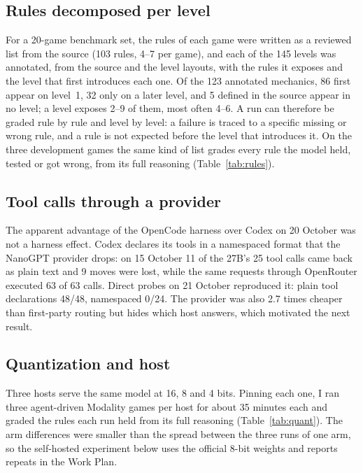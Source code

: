 \documentclass[11pt,a4paper]{article}
\begin{document}
\subsection{Rules decomposed per level}
\label{sec:rules}

For a 20-game benchmark set, the rules of each game were written as a
reviewed list from the source (103 rules, 4--7 per game), and each of the 145
levels was annotated, from the source and the level layouts, with the rules
it exposes and the level that first introduces each one. Of the 123
annotated mechanics, 86 first appear on level~1, 32 only on a later level,
and 5 defined in the source appear in no level; a level exposes 2--9 of them,
most often 4--6. A run can therefore be graded rule by rule and level by
level: a failure is traced to a specific missing or wrong rule, and a rule
is not expected before the level that introduces it. On the three
development games the same kind of list grades every rule the model held,
tested or got wrong, from its full reasoning (Table~\ref{tab:rules}).

\subsection{Tool calls through a provider}
\label{sec:q1}

The apparent advantage of the OpenCode harness over Codex on 20 October was
not a harness effect. Codex declares its tools in a namespaced format that
the NanoGPT provider drops: on 15 October 11 of the 27B's 25 tool calls came
back as plain text and 9 moves were lost, while the same requests through
OpenRouter executed 63 of 63 calls. Direct probes on 21 October reproduced it:
plain tool declarations 48/48, namespaced 0/24. The provider was also 2.7
times cheaper than first-party routing but hides which host answers, which
motivated the next result.

\subsection{Quantization and host}

Three hosts serve the same model at 16, 8 and 4 bits. Pinning each one, I ran
three agent-driven Modality games per host for about 35 minutes each and
graded the rules each run held from its full reasoning
(Table~\ref{tab:quant}). The arm differences were smaller than the spread
between the three runs of one arm, so the self-hosted experiment below uses
the official 8-bit weights and reports repeats in the Work Plan.
\end{document}
